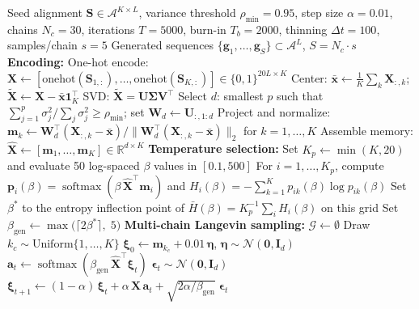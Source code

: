 \documentclass[10pt]{article}
\begin{document}
\begin{algorithm}[ht]
\caption{Stochastic Attention Protein Sequence Generation}\label{alg:sa-pipeline}
\begin{algorithmic}[1]
\REQUIRE Seed alignment $\mathbf{S} \in \mathcal{A}^{K \times L}$, variance threshold $\rho_{\min} = 0.95$, step size $\alpha = 0.01$, chains $N_c = 30$, iterations $T = 5000$, burn-in $T_b = 2000$, thinning $\Delta t = 100$, samples/chain $s = 5$
\ENSURE Generated sequences $\{\mathbf{g}_1, \ldots, \mathbf{g}_S\} \subset \mathcal{A}^L$, \; $S = N_c \cdot s$
\STATE \textbf{Encoding:}
\STATE One-hot encode: $\mathbf{X} \leftarrow [\mathrm{onehot}(\mathbf{S}_{1,:}), \ldots, \mathrm{onehot}(\mathbf{S}_{K,:})] \in \{0,1\}^{20L \times K}$
\STATE Center: $\bar{\mathbf{x}} \leftarrow \frac{1}{K}\sum_k \mathbf{X}_{:,k}$; \; $\tilde{\mathbf{X}} \leftarrow \mathbf{X} - \bar{\mathbf{x}}\mathbf{1}_K^\top$
\STATE SVD: $\tilde{\mathbf{X}} = \mathbf{U}\boldsymbol{\Sigma}\mathbf{V}^\top$
\STATE Select $d$: smallest $p$ such that $\sum_{j=1}^{p}\sigma_j^2 / \sum_j \sigma_j^2 \geq \rho_{\min}$; set $\mathbf{W}_d \leftarrow \mathbf{U}_{:,1:d}$
\STATE Project and normalize: $\mathbf{m}_k \leftarrow \mathbf{W}_d^\top(\mathbf{X}_{:,k} - \bar{\mathbf{x}}) / \|\mathbf{W}_d^\top(\mathbf{X}_{:,k} - \bar{\mathbf{x}})\|_2$ \; for $k = 1,\ldots,K$
\STATE Assemble memory: $\hat{\mathbf{X}} \leftarrow [\mathbf{m}_1, \ldots, \mathbf{m}_K] \in \mathbb{R}^{d \times K}$
\STATE \textbf{Temperature selection:}
\STATE Set $K_p \leftarrow \min(K,20)$ and evaluate 50 log-spaced $\beta$ values in $[0.1,500]$
\STATE For $i=1,\ldots,K_p$, compute $\mathbf{p}_i(\beta)=\operatorname{softmax}(\beta\,\hat{\mathbf{X}}^\top\mathbf{m}_i)$ and $H_i(\beta)=-\sum_{k=1}^{K} p_{ik}(\beta)\log p_{ik}(\beta)$
\STATE Set $\beta^*$ to the entropy inflection point of $\bar H(\beta)=K_p^{-1}\sum_i H_i(\beta)$ on this grid
\STATE Set $\beta_{\mathrm{gen}} \leftarrow \max\!\bigl(\lceil 2\beta^* \rceil,\; 5\bigr)$
\STATE \textbf{Multi-chain Langevin sampling:}
\STATE $\mathcal{G} \leftarrow \emptyset$
    \STATE Draw $k_c \sim \mathrm{Uniform}\{1,\ldots,K\}$
    \STATE $\boldsymbol{\xi}_0 \leftarrow \mathbf{m}_{k_c} + 0.01\,\boldsymbol{\eta}$, \; $\boldsymbol{\eta} \sim \mathcal{N}(\mathbf{0}, \mathbf{I}_d)$
        \STATE $\mathbf{a}_t \leftarrow \operatorname{softmax}(\beta_{\mathrm{gen}}\,\hat{\mathbf{X}}^\top\boldsymbol{\xi}_t)$
        \STATE $\boldsymbol{\epsilon}_t \sim \mathcal{N}(\mathbf{0}, \mathbf{I}_d)$
        \STATE $\boldsymbol{\xi}_{t+1} \leftarrow (1-\alpha)\,\boldsymbol{\xi}_t + \alpha\,\hat{\mathbf{X}}\,\mathbf{a}_t + \sqrt{2\alpha/\beta_{\mathrm{gen}}}\;\boldsymbol{\epsilon}_t$

\end{algorithmic}
\end{algorithm}
\end{document}
